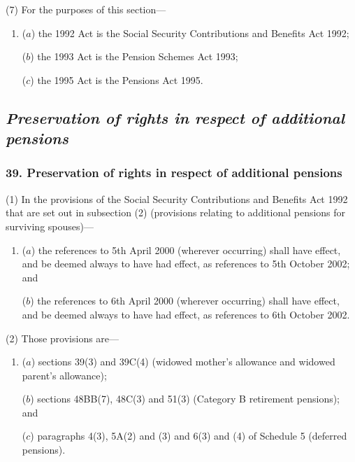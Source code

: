 \documentclass[12pt,a4paper]{article}
\begin{document}
(7) For the purposes of this section—
\begin{enumerate}\item[]
($a$) the 1992 Act is the Social Security Contributions and Benefits Act 1992;

($b$) the 1993 Act is the Pension Schemes Act 1993;

($c$) the 1995 Act is the Pensions Act 1995. 
\end{enumerate}

\subsection{\itshape Preservation of rights in respect of additional pensions}

\subsubsection{39. Preservation of rights in respect of additional pensions}

(1) In the provisions of the Social Security Contributions and Benefits Act 1992 that are set out in subsection (2)  (provisions relating to additional pensions for surviving spouses)—
\begin{enumerate}\item[]
($a$) the references to 5th April 2000 (wherever occurring) shall have effect, and be deemed always to have had effect, as references to 5th October 2002; and

($b$) the references to 6th April 2000 (wherever occurring) shall have effect, and be deemed always to have had effect, as references to 6th October 2002. 
\end{enumerate}

(2) Those provisions are—
\begin{enumerate}\item[]
($a$) sections 39(3)  and 39C(4)  (widowed mother’s allowance and widowed parent’s allowance);

($b$) sections 48BB(7), 48C(3)  and 51(3)  (Category B retirement pensions); and

($c$) paragraphs 4(3), 5A(2)  and (3)  and 6(3)  and (4)  of Schedule 5 (deferred pensions).
\end{enumerate}
\end{document}
